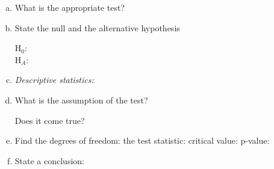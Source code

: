 \begin{enumerate}[a)]
	\item What is the appropriate test? 	\hrulefill
	
	\item		
			State the null and the alternative hypothesis
			
			H$_0$: 	\hrulefill 	\\
			H$_A$: \hrulefill 	


	\item \emph{Descriptive statistics: 	}
	\vspace{5em}

	\item What is the assumption of the test? \hrulefill
	
	 	Does it come true? \hrulefill
	 	
	 \item Find the degrees of freedom: \hrulefill\quad
		 the test statistic: \hrulefill\quad 
		 critical value: \hrulefill\quad 
		 p-value: 	\hrulefill\quad
	\item State a conclusion: \hrulefill
	
\end{enumerate}
